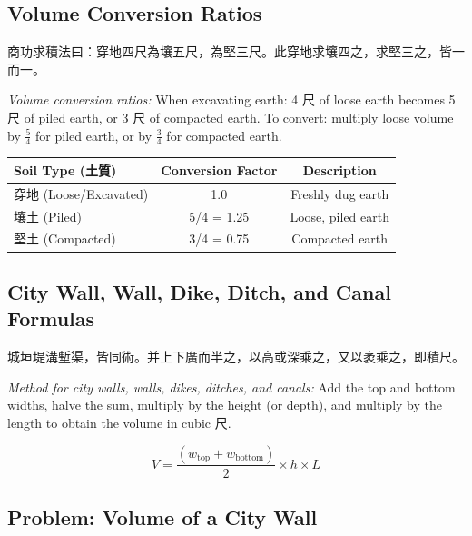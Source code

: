 \documentclass[11pt,a4paper]{article}
\newcommand{\zh}[1]{{#1}}
\newenvironment{chpassage}{%
  \par\medskip
  \begin{center}
  \begin{minipage}{0.95\textwidth}
  \setlength{\parindent}{2em}
  \linespread{1.3}\selectfont
}{%
  \end{minipage}
  \end{center}
  \medskip
}
\begin{document}
\subsection{Volume Conversion Ratios}

\begin{chpassage}
\zh{商功求積法曰：穿地四尺為壤五尺，為堅三尺。此穿地求壤四之，求堅三之，皆一而一。}

\medskip
\textit{Volume conversion ratios:} When excavating earth: 4 \zh{尺} of loose
earth becomes 5 \zh{尺} of piled earth, or 3 \zh{尺} of compacted earth. To
convert: multiply loose volume by $\frac{5}{4}$ for piled earth, or by
$\frac{3}{4}$ for compacted earth.
\end{chpassage}

\begin{center}
\begin{tabular}{|l|c|c|}
\hline
\textbf{Soil Type (\zh{土質})} & \textbf{Conversion Factor} & \textbf{Description} \\
\hline
\zh{穿地} (Loose/Excavated) & 1.0 & Freshly dug earth \\
\zh{壤土} (Piled) & 5/4 = 1.25 & Loose, piled earth \\
\zh{堅土} (Compacted) & 3/4 = 0.75 & Compacted earth \\
\hline
\end{tabular}
\end{center}

\subsection{City Wall, Wall, Dike, Ditch, and Canal Formulas}

\begin{chpassage}
\zh{城垣堤溝塹渠，皆同術。并上下廣而半之，以高或深乘之，又以袤乘之，即積尺。}

\medskip
\textit{Method for city walls, walls, dikes, ditches, and canals:} Add the
top and bottom widths, halve the sum, multiply by the height (or depth), and
multiply by the length to obtain the volume in cubic \zh{尺}.

\[
V = \frac{(w_{\text{top}} + w_{\text{bottom}})}{2} \times h \times L
\]
\end{chpassage}

\subsection{Problem: Volume of a City Wall}
\end{document}
